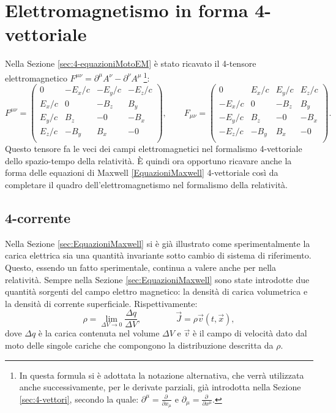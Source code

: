 \section{Elettromagnetismo in forma 4-vettoriale}
Nella Sezione \ref{sec:4-equazioniMotoEM} è stato ricavato il 4-tensore elettromagnetico $F^{\mu\nu}=\partial^\mu A^\nu-\partial^\nu A^\mu\ $\footnote{In questa formula si è adottata la notazione alternativa, che verrà utilizzata anche successivamente, per le derivate parziali, già introdotta nella Sezione \ref{sec:4-vettori}, secondo la quale: $\partial^\mu=\frac{\partial\ }{\partial x_\mu}$ e $\partial_\mu=\frac{\partial\ }{\partial x^\mu}$.}:
\begin{equation*}
        F^{\mu\nu}=
    \begin{pmatrix}
        0&-E_x/c&-E_y/c&-E_z/c\\
        E_x/c&0&-B_z&B_y\\
        E_y/c&B_z&-0&-B_x\\
        E_z/c&-B_y&B_x&-0\\
 \end{pmatrix},\qquad
 F_{\mu\nu}=
 \begin{pmatrix}
     0&E_x/c&E_y/c&E_z/c\\
     -E_x/c&0&-B_z&B_y\\
     -E_y/c&B_z&-0&-B_x\\
     -E_z/c&-B_y&B_x&-0\\
\end{pmatrix}.
\end{equation*}
Questo tensore fa le veci dei campi elettromagnetici nel formalismo 4-vettoriale dello spazio-tempo della relatività.
È quindi ora opportuno ricavare anche la forma delle equazioni di Maxwell \eqref{EquazioniMaxwell} 4-vettoriale così da completare il quadro dell'elettromagnetismo nel formalismo della relatività.
\subsection{4-corrente}\label{sec:4-corrente}
Nella Sezione \ref{sec:EquazioniMaxwell} si è già illustrato come sperimentalmente la carica elettrica sia una quantità invariante sotto cambio di sistema di riferimento. Questo, essendo un fatto sperimentale, continua a valere anche per nella relatività. Sempre nella Sezione \ref{sec:EquazioniMaxwell} sono state introdotte due quantità sorgenti del campo elettro magnetico: la densità di carica volumetrica e la densità di corrente superficiale. Rispettivamente:
\begin{equation}
    \rho=\lim_{\Delta V\rightarrow 0}\frac{\Delta q}{\Delta V},\qquad\qquad \vec J=\rho\vec v(t,\vec x),\label{defRhoJ}
\end{equation}
dove $\Delta q$ è la carica contenuta nel volume $\Delta V$ e $\vec v$ è il campo di velocità dato dal moto delle singole cariche che compongono la distribuzione descritta da $\rho$.\\

